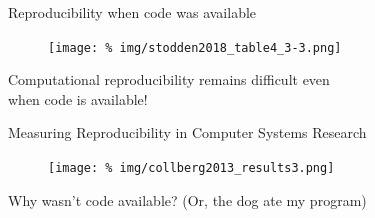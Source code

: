 \begin{frame}{Reproducibility when code was available}

    \begin{figure}
      \centering
      \texttt{[image: \%
      img/stodden2018\_table4\_3-3.png]} %
    \end{figure}

    \vspace{-1.25cm}
  
\begin{center}
      Computational reproducibility remains difficult even \\when code is available!
      
\end{center}
  
    
\end{frame}






\begin{frame}{\large Measuring Reproducibility in Computer Systems Research}

  \begin{figure}
    \centering
    \texttt{[image: \%
      img/collberg2013\_results3.png]} %
  \end{figure}
  


  
  
\end{frame}


\begin{frame}{\large Why wasn't code available? (Or, the dog ate my program)}
  
  
  
\end{frame}
